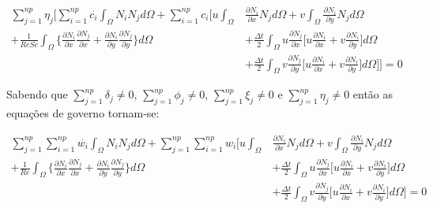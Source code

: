 \begin{equation}
 \begin{aligned} 
  \sum\limits_{j=1}^{np} \eta_j \Bigg[
  \sum\limits_{i=1}^{np} \overset{.}{c_i} \int_{\Omega} N_i N_j d\Omega 
  + \sum\limits_{i=1}^{np} c_i \Bigg[
    u \int_{\Omega} & \frac{\partial N_i}{\partial x} N_j d\Omega 
  + v \int_{\Omega} \frac{\partial N_i}{\partial y} N_j d\Omega 
  \\[5pt]
  + \frac{1}{\textit{ReSc}} \int_{\Omega} \Bigg\{ 
                    \frac{\partial N_i}{\partial x} 
                    \frac{\partial N_j}{\partial x} 
  +                 \frac{\partial N_i}{\partial y} 
                    \frac{\partial N_j}{\partial y} 
  \Bigg\} d\Omega 
 & + \frac{\Delta t}{2} \int_{\Omega} u \frac{\partial N_j}{\partial x}
 \Bigg[
   u \frac{\partial N_i}{\partial x}
 + v \frac{\partial N_i}{\partial y}
 \Bigg] d\Omega
 \\[5pt]
 & + \frac{\Delta t}{2} \int_{\Omega} v \frac{\partial N_j}{\partial y}
 \Bigg[
   u \frac{\partial N_i}{\partial x}
 + v \frac{\partial N_i}{\partial y}
 \Bigg] d\Omega
  \Bigg] \Bigg] = 0
 \end{aligned}
\end{equation}


\noindent
Sabendo que 
$\sum\limits_{j=1}^{np} \delta_j \neq 0$,
$\sum\limits_{j=1}^{np} \phi_j \neq 0$, 
$\sum\limits_{j=1}^{np} \xi_j \neq 0$ e 
$\sum\limits_{j=1}^{np} \eta_j \neq 0$ 
então as equações de governo tornam-se:

\begin{equation}
 \begin{aligned} 
  \sum\limits_{j=1}^{np} 
  \sum\limits_{i=1}^{np} \overset{.}{w_i} \int_{\Omega} N_i N_j d\Omega 
  + \sum\limits_{j=1}^{np} 
    \sum\limits_{i=1}^{np} w_i \Bigg[
    u \int_{\Omega} & \frac{\partial N_i}{\partial x} N_j d\Omega 
  + v \int_{\Omega} \frac{\partial N_i}{\partial y} N_j d\Omega
  \\[5pt]
  + \frac{1}{\textit{Re}} \int_{\Omega} \Bigg\{ 
                    \frac{\partial N_i}{\partial x} 
                    \frac{\partial N_j}{\partial x} 
  +                 \frac{\partial N_i}{\partial y} 
                    \frac{\partial N_j}{\partial y} 
  \Bigg\} d\Omega 
 & + \frac{\Delta t}{2} \int_{\Omega} u \frac{\partial N_j}{\partial x}
 \Bigg[
   u \frac{\partial N_i}{\partial x}
 + v \frac{\partial N_i}{\partial y}
 \Bigg] d\Omega
 \\[5pt]
 & + \frac{\Delta t}{2} \int_{\Omega} v \frac{\partial N_j}{\partial y}
 \Bigg[
   u \frac{\partial N_i}{\partial x}
 + v \frac{\partial N_i}{\partial y}
 \Bigg] d\Omega
  \Bigg] = 0
 \end{aligned}
\end{equation}

